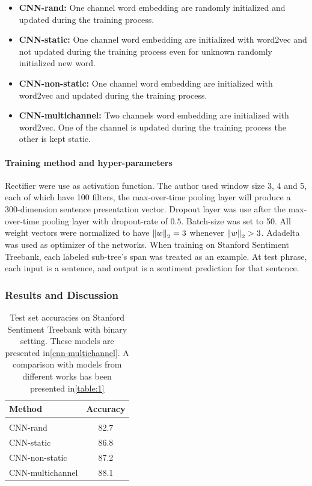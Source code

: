 \begin{itemize}
  	\item \textbf{CNN-rand:} One channel word embedding are randomly initialized and updated during the training process.\label{cnn-rand}
	\item \textbf{CNN-static:} One channel word embedding are initialized with word2vec\cite{word2vec} and not updated during the training process even for unknown randomly initialized new word.\label{cnn-static}
	\item \textbf{CNN-non-static:} One channel word embedding are initialized with word2vec and updated during the training process.\label{cnn-non-static}
	\item \textbf{CNN-multichannel:} Two channels word embedding are initialized with word2vec. One of the channel is updated during the training process the other is kept static.\label{cnn-multichannel}
\end{itemize}
\paragraph{Training method and hyper-parameters} 
Rectifier\cite{rectifier} were use as activation function.
The author used window size 3, 4 and 5, each of which have 100 filters, the max-over-time pooling layer will produce a 300-dimension sentence presentation vector. 
Dropout layer was use after the max-over-time pooling layer with dropout-rate of \(0.5\).  
Batch-size was set to 50. 
All weight vectors were normalized to have \(\left\lVert w \right\rVert_2 = 3\) whenever \(\left\lVert w \right\rVert_2 > 3\). 
Adadelta\cite{adadelta} was used as optimizer of the networks.
When training on Stanford Sentiment Treebank, each labeled sub-tree's span was treated as an example.
At test phrase, each input is a sentence, and output is a sentiment prediction for that sentence.

\subsubsection{Results and Discussion}\label{kimcnn-drawback}
\begin{table}[H]
\centering
\begin{tabular}{l c} 
 \hline
 \hline 
 Method & Accuracy \\ [0.5ex] 
 \hline
 \hline
 \\  
 CNN-rand & 82.7 \\ 
 CNN-static & 86.8 \\ 
 CNN-non-static & 87.2 \\ 
 CNN-multichannel & 88.1 \\ 
 \hline
 \hline
\end{tabular}
\caption{Test set accuracies on Stanford Sentiment Treebank with binary setting. These models are presented in\ref{cnn-multichannel}.
A comparison with models from different works has been presented in\ref{table:1}}
\label{table:KimCNN}
\end{table}

